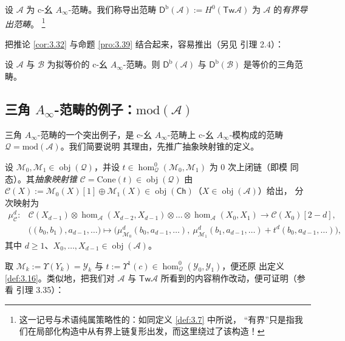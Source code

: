 \begin{Def}\label{def:3.51}
设 $\mathcal A$ 为 c-幺 $A_\infty$-范畴。我们称导出范畴
$\mathsf D^{\mathrm b}(\mathcal A):=H^0(\mathsf{Tw}\mathcal A)$ 为
$\mathcal A$ 的\emph{有界导出范畴}。%
\footnote{这一记号与术语纯属策略性的：如同定义 \ref{def:3.7} 中所说，
“有界”只是指我们在局部化构造中从有界上链复形出发，而这里绕过了该构造！}
\end{Def}

把推论 \ref{cor:3.32} 与命题 \ref{pro:3.39} 结合起来，容易推出（另见
\cite{Sei13} 引理 2.4）：

\begin{Cor}\label{cor:3.52}
设 $\mathcal A$ 与 $\mathcal B$ 为拟等价的 c-幺 $A_\infty$-范畴。则
$\mathsf D^{\mathrm b}(\mathcal A)$ 与 $\mathsf D^{\mathrm b}(\mathcal B)$
是等价的三角范畴。
\end{Cor}

\subsection{三角 $A_\infty$-范畴的例子：$\mathrm{mod}(\mathcal A)$}\label{sec:3.7}

三角 $A_\infty$-范畴的一个突出例子，是 c-幺 $A_\infty$-范畴上 c-幺
$A_\infty$-模构成的范畴 $\mathcal Q=\mathrm{mod}(\mathcal A)$。我们简要说明
其理由，先推广抽象映射锥的定义。

\begin{Def}\label{def:3.53}
设 $\mathcal M_0,\mathcal M_1\in\operatorname{obj}(\mathcal Q)$，并设
$t\in\hom^0_{\mathcal Q}(\mathcal M_0,\mathcal M_1)$ 为 0 次上闭链（即模
同态）。其\emph{抽象映射锥}
$\mathcal C=\mathrm{Cone}(t)\in\operatorname{obj}(\mathcal Q)$ 由
$\mathcal C(X):=\mathcal M_0(X)[1]\oplus\mathcal M_1(X)\in
\operatorname{obj}(\mathsf{Ch})$（$X\in\operatorname{obj}(\mathcal A)$）给出，
分次映射为
\[
  \begin{aligned}
    \mu^d_{\mathcal C}:{}&\mathcal C(X_{d-1})\otimes
    \hom_{\mathcal A}(X_{d-2},X_{d-1})\otimes\dots\otimes
    \hom_{\mathcal A}(X_0,X_1)\longrightarrow\mathcal C(X_0)[2-d],\\
    &\bigl((b_0,b_1),a_{d-1},\dots\bigr)\longmapsto
    \bigl(\mu^d_{\mathcal M_0}(b_0,a_{d-1},\dots),\ 
    \mu^d_{\mathcal M_1}(b_1,a_{d-1},\dots)+t^d(b_0,a_{d-1},\dots)\bigr),
  \end{aligned}
\]
其中 $d\ge 1$、$X_0,\dots,X_{d-1}\in\operatorname{obj}(\mathcal A)$。
\end{Def}

取 $\mathcal M_k:=\Upsilon(Y_k)=\mathcal Y_k$ 与
$t:=\Upsilon^1(c)\in\hom^0_{\mathcal Q}(\mathcal Y_0,\mathcal Y_1)$，便还原
出定义 \ref{def:3.16}。类似地，把我们对 $\mathcal A$ 与
$\mathsf{Tw}\mathcal A$ 所看到的内容稍作改动，便可证明（参看 \cite{Sei08}
引理 3.35）：

